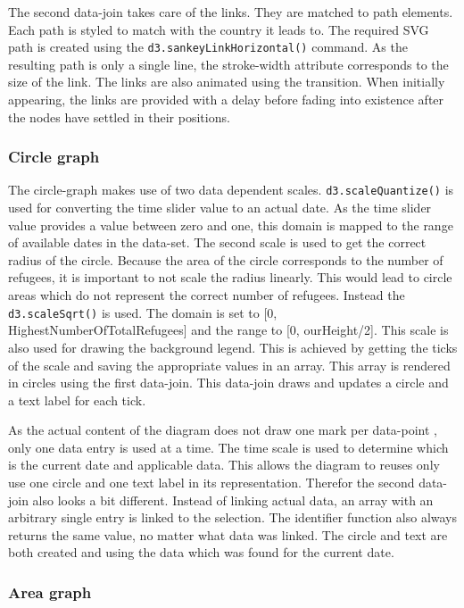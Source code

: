 The second data-join takes care of the links. They are matched to path elements. Each path is styled to match with the country it leads to. The required SVG path is created using the \texttt{d3.sankeyLinkHorizontal()} command. As the resulting path is only a single line, the stroke-width attribute corresponds to the size of the link. The links are also animated using the transition. When initially appearing, the links are provided with a delay before fading into existence after the nodes have settled in their positions.

\subsubsection{Circle graph}

The circle-graph makes use of two data dependent scales. \texttt{d3.scaleQuantize()} is used for converting the time slider value to an actual date. As the time slider value provides a value between zero and one, this domain is mapped to the range of available dates in the data-set. The second scale is used to get the correct radius of the circle. Because the area of the circle corresponds to the number of refugees, it is important to not scale the radius linearly. This would lead to circle areas which do not represent the correct number of refugees. Instead the \texttt{d3.scaleSqrt()} is used. The domain is set to [0, HighestNumberOfTotalRefugees] and the range to [0, ourHeight/2]. This scale is also used for drawing the background legend. This is achieved by getting the ticks of the scale and saving the appropriate values in an array. This array is rendered in circles using the first data-join. This data-join draws and updates a circle and a text label for each tick.


As the actual content of the diagram does not draw one mark per data-point , only one data entry is used at a time. The time scale is used to determine which is the current date and applicable data. This allows the diagram to reuses only use one circle and one text label in its representation. Therefor the second data-join also looks a bit different. Instead of linking actual data, an array with an arbitrary single entry is linked to the selection. The identifier function also always returns the same value, no matter what data was linked. The circle and text are both created and using the data which was found for the current date.


\subsubsection{Area graph}

